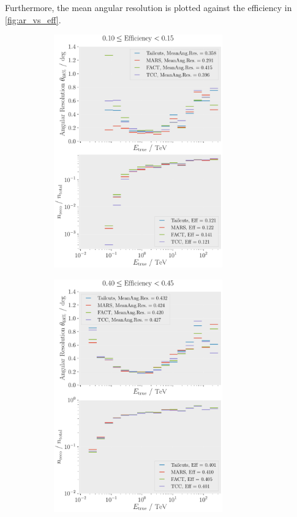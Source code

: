 Furthermore, the mean angular resolution is plotted against the efficiency in \autoref{fig:ar_vs_eff}.
\vspace{-0.2cm}
\begin{figure}
    \centering
    \begin{subfigure}{0.48\textwidth}
        \centering
        \includegraphics[width=0.8\textwidth]{plots/ar_aeff/AR_Aeff_MST_0.10_0.15.pdf}
    \end{subfigure}
    \hfill
    \begin{subfigure}{0.48\textwidth}
        \centering
        \includegraphics[width=0.8\textwidth]{plots/ar_aeff/AR_Aeff_MST_0.40_0.45.pdf}

\end{subfigure}
\end{figure}
